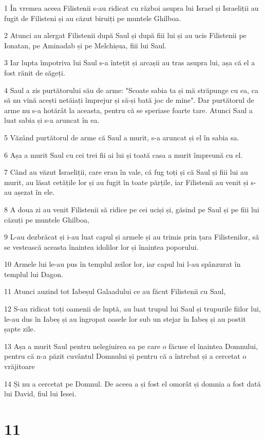 \par 1 În vremea aceea Filistenii s-au ridicat cu război asupra lui Israel și Israeliții au fugit de Filisteni și au căzut biruiți pe muntele Ghilboa.
\par 2 Atunci au alergat Filistenii după Saul și după fiii lui și au ucis Filistenii pe Ionatan, pe Aminadab și pe Melchișua, fiii lui Saul.
\par 3 Iar lupta împotriva lui Saul s-a întețit și arcașii au tras asupra lui, așa că el a fost rănit de săgeți.
\par 4 Saul a zis purtătorului său de arme: "Scoate sabia ta și mă străpunge cu ea, ca să nu vină acești netăiați împrejur și să-și bată joc de mine". Dar purtătorul de arme nu s-a hotărât la aceasta, pentru că se speriase foarte tare. Atunci Saul a luat sabia și s-a aruncat în ea.
\par 5 Văzând purtătorul de arme că Saul a murit, s-a aruncat și el în sabia sa.
\par 6 Așa a murit Saul cu cei trei fii ai lui și toată casa a murit împreună cu el.
\par 7 Când au văzut Israeliții, care erau în vale, că fug toți și că Saul și fiii lui au murit, au lăsat cetățile lor și au fugit în toate părțile, iar Filistenii au venit și s-au așezat în ele.
\par 8 A doua zi au venit Filistenii să ridice pe cei uciși și, găsind pe Saul și pe fiii lui căzuți pe muntele Ghilboa,
\par 9 L-au dezbrăcat și i-au luat capul și armele și au trimis prin țara Filistenilor, să se vestească aceasta înaintea idolilor lor și înaintea poporului.
\par 10 Armele lui le-au pus în templul zeilor lor, iar capul lui l-au spânzurat în templul lui Dagon.
\par 11 Atunci auzind tot Iabeșul Galaadului ce au făcut Filistenii cu Saul,
\par 12 S-au ridicat toți oamenii de luptă, au luat trupul lui Saul și trupurile fiilor lui, le-au dus în Iabeș și au îngropat oasele lor sub un stejar în Iabeș și au postit șapte zile.
\par 13 Așa a murit Saul pentru nelegiuirea sa pe care o făcuse el înaintea Domnului, pentru că n-a păzit cuvântul Domnului și pentru că a întrebat și a cercetat o vrăjitoare
\par 14 Și nu a cercetat pe Domnul. De aceea a și fost el omorât și domnia a fost dată lui David, fiul lui Iesei.

\chapter{11}

